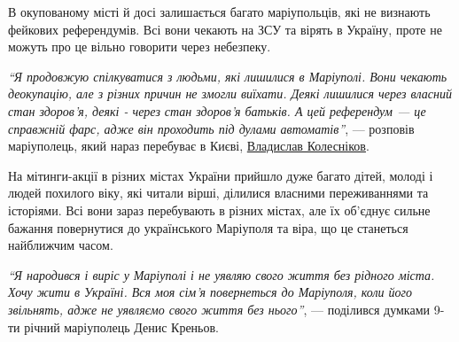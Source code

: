 

В окупованому місті й досі залишається багато маріупольців, які не визнають
фейкових референдумів. Всі вони чекають на ЗСУ та вірять в Україну, проте не
можуть про це вільно говорити через небезпеку.

\begin{leftbar}
\emph{\enquote{Я продовжую спілкуватися з людьми, які лишилися в Маріуполі. Вони чекають
деокупацію, але з різних причин не змогли виїхати. Деякі лишилися через
власний стан здоров'я, деякі - через стан здоров'я батьків. А цей
референдум — це справжній фарс, адже він проходить під дулами
автоматів}}, — розповів маріуполець, який нараз перебуває в Києві,
\href{https://www.facebook.com/profile.php?id=100000675250442}{Владислав Колесніков}.
\end{leftbar}


На мітинги-акції в різних містах України прийшло дуже багато дітей, молоді і
людей похилого віку, які читали вірші, ділилися власними переживаннями та
історіями. Всі вони зараз перебувають в різних містах, але їх об'єднує сильне
бажання повернутися до українського Маріуполя та віра, що це станеться
найближчим часом.

\begin{leftbar}
\emph{\enquote{Я народився і виріс у Маріуполі і не уявляю свого життя без рідного міста.
Хочу жити в Україні. Вся моя сім'я повернеться до Маріуполя, коли його
звільнять, адже не уявляємо свого життя без нього}}, — поділився думками
9-ти річний маріуполець Денис Креньов.
\end{leftbar}


